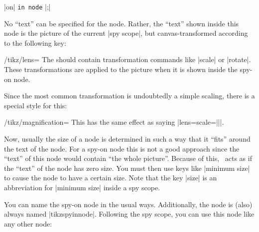 \begin{command}{\spy {} |on|  \texttt{in node} |;|}
\begin{enumerate}
\begin{codeexample}[preamble={\usetikzlibrary{decorations.fractals,spy}}]
\end{codeexample}
            No ``text'' can be specified for the node. Rather, the ``text''
            shown inside this node is the picture of the current |spy scope|,
            but canvas-transformed according to the following key:
            \begin{key}{/tikz/lens=}
                The  should contain transformation commands like
                |scale| or |rotate|. These transformations are applied to the
                picture when it is shown inside the spy-on node.
            \end{key}
            Since the most common transformation is undoubtedly a simple
            scaling, there is a special style for this:
            \begin{key}{/tikz/magnification=}
                This has the same effect as saying
                |lens={scale=||}|.
            \end{key}
            Now, usually the size of a node is determined in such a way that it
            ``fits'' around the text of the node. For a spy-on node this is not
            a good approach since the ``text'' of this node would contain ``the
            whole picture''. Because of this, \tikzname\ acts as if the
            ``text'' of the node has zero size. You must then use keys like
            |minimum size| to cause the node to have a certain size. Note that
            the key |size| is an abbreviation for |minimum size| inside a spy
            scope.

            You can name the spy-on node in the usual ways. Additionally, the
            node is (also) always named |tikzspyinnode|. Following the spy
            scope, you can use this node like any other node:
\begin{codeexample}[preamble={\usetikzlibrary{decorations.fractals,spy}}]
\end{codeexample}
\end{enumerate}
\end{command}
